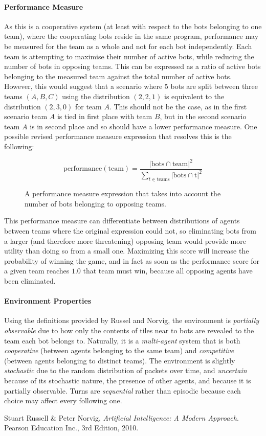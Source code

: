 \documentclass[a4paper,10pt]{article}
\begin{document}
\paragraph{Performance Measure}
As this is a cooperative system (at least with respect to the bots belonging to one team), where the cooperating bots reside in the same program, performance may be measured for the team as a whole and not for each bot independently. Each team is attempting to maximise their number of active bots, while reducing the number of bots in opposing teams. This can be expressed as a ratio of active bots belonging to the measured team against the total number of active bots. However, this would suggest that a scenario where 5 bots are split between three teams $(A, B, C)$ using the distribution $(2, 2, 1)$ is equivalent to the distribution $(2, 3, 0)$ for team $A$. This should not be the case, as in the first scenario team $A$ is tied in first place with team $B$, but in the second scenario team $A$ is in second place and so should have a lower performance measure. One possible revised performance measure expression that resolves this is the following:

\begin{figure}[ht]
  \centering
  \begin{minipage}{0.8\textwidth}
    $$
      \text{performance}(\text{team}) = \frac
        {\left|\text{bots} \cap \text{team}\right|^2}
        {\sum_{t \in \text{teams}} \left|\text{bots} \cap \text{t}\right|^2}
    $$
    \caption{A performance measure expression that takes into account the number of bots belonging to opposing teams.}
  \end{minipage}
\end{figure}

This performance measure can differentiate between distributions of agents between teams where the original expression could not, so eliminating bots from a larger (and therefore more threatening) opposing team would provide more utility than doing so from a small one. Maximizing this score will increase the probability of winning the game, and in fact as soon as the performance score for a given team reaches $1.0$ that team must win, because all opposing agents have been eliminated.

\paragraph{Environment Properties}
Using the definitions provided by Russel and Norvig\cite{norvig10}, the environment is \emph{partially observable} due to how only the contents of tiles near to bots are revealed to the team each bot belongs to. Naturally, it is a \emph{multi-agent} system that is both \emph{cooperative} (between agents belonging to the same team) and \emph{competitive} (between agents belonging to distinct teams). The environment is slightly \emph{stochastic} due to the random distribution of packets over time, and \emph{uncertain} because of its stochastic nature, the presence of other agents, and because it is partially observable. Turns are \emph{sequential} rather than episodic because each choice may affect every following one.

\begin{thebibliography}{9}
    Stuart Russell \& Peter Norvig,
    \emph{Artificial Intelligence: A Modern Approach}. \newline
    Pearson Education Inc.,
    3rd Edition,
    2010.
\end{thebibliography}
\end{document}

